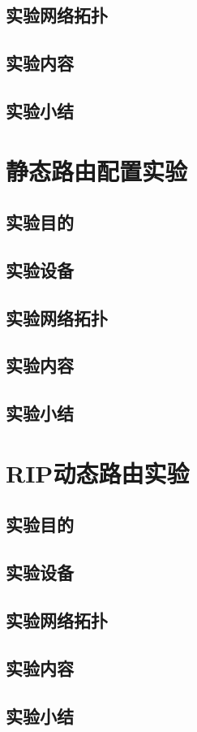 \documentclass[lang=cn,11pt,a4paper,cite=authoryear]{elegantpaper}
\begin{document}
\subsection{实验网络拓扑}
\subsection{实验内容}
\subsection{实验小结}
\section{静态路由配置实验}
\subsection{实验目的}
\subsection{实验设备}
\subsection{实验网络拓扑}
\subsection{实验内容}
\subsection{实验小结}
\section{RIP动态路由实验}
\subsection{实验目的}
\subsection{实验设备}
\subsection{实验网络拓扑}
\subsection{实验内容}
\subsection{实验小结}
\end{document}
